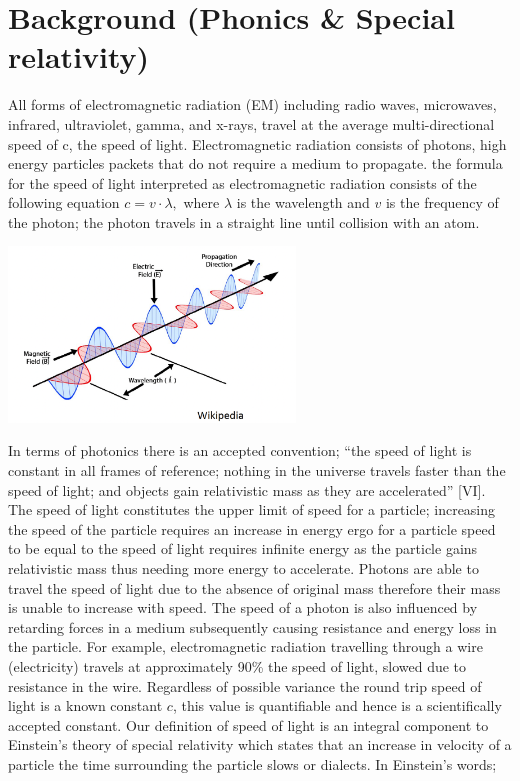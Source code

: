 \documentclass[12pt,letterpaper]{article}
\begin{document}
\section{Background (Phonics \& Special relativity)}
All forms of electromagnetic radiation (EM) including radio waves, microwaves, infrared, ultraviolet, gamma, and x-rays, travel at the average multi-directional speed of c, the speed of light. Electromagnetic radiation consists of photons, high energy particles packets that do not require a medium to propagate.  the formula for the speed of light interpreted as electromagnetic radiation consists of the following equation $c=v\cdot \lambda,$ where  $\lambda$ is the  wavelength and $v$ is the frequency of the photon; the photon travels in a straight line until collision with an atom. 
\begin{center}
    \includegraphics[width=3in]{Screenshot 2022-05-07 at 23.03.52.png}
\end{center}
In terms of photonics there is an accepted convention; “the speed of light is constant in all frames of reference; nothing in the universe travels faster than the speed of light; and objects gain relativistic mass as they are accelerated” [VI]. The speed of light constitutes the upper limit of speed for a particle; increasing the speed of the particle requires an increase in energy ergo for a particle speed to be equal to the speed of light requires infinite energy as the particle gains relativistic mass thus needing more energy to accelerate. Photons are able to travel the speed of light due to the absence of original mass therefore their mass is unable to increase with speed. The speed of a photon is also influenced by retarding forces in a medium subsequently causing resistance and energy loss in the particle. For example, electromagnetic radiation travelling through a wire (electricity) travels at approximately 90\% the speed of light, slowed due to resistance in the wire. Regardless of possible variance the round trip speed of light is a known constant $c$, this value is quantifiable and hence is a scientifically accepted constant. Our definition of speed of light is an integral component to Einstein's theory of special relativity which states that an increase in velocity of a particle the time surrounding the particle slows or dialects. In Einstein's words;
\end{document}
